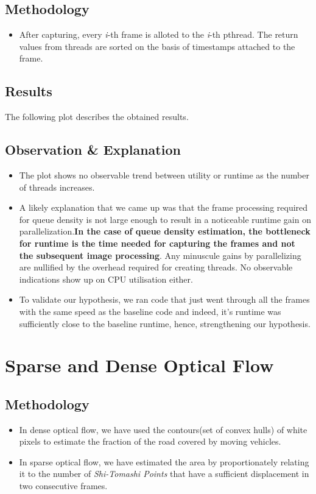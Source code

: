 \documentclass[a4paper]{article}
\begin{document}
\subsection*{Methodology}
\begin{itemize}
    \item After capturing, every \textit{i}-th frame is alloted to the \textit{i}-th pthread.  The return values from threads are sorted on the basis of timestamps attached to the frame.
\end{itemize}
\subsection*{Results}
The following plot describes the obtained results.
\subsection*{Observation \& Explanation}
\begin{itemize}
    \item The plot shows no observable trend between utility or runtime as the number of threads increases. \item A likely explanation that we came up was that the frame processing required for queue density is not large enough to result in a noticeable runtime gain on parallelization.\textbf{In the case of queue density estimation, the bottleneck for runtime is the time needed for capturing the frames and not the subsequent image processing}. Any minuscule gains by parallelizing are nullified by the overhead required for creating threads. No observable indications show up on CPU utilisation either.
    \item To validate our hypothesis, we ran code that just went through all the frames with the same speed as the baseline code and indeed, it's runtime was sufficiently close to the baseline runtime, hence, strengthening our hypothesis.
\end{itemize}
\section*{Sparse and Dense Optical Flow}
\subsection*{Methodology}
\begin{itemize}
    \item In dense optical flow, we have used the contours(set of convex hulls) of white pixels to estimate the fraction of the road covered by moving vehicles.
    \item In sparse optical flow, we have estimated the area by proportionately relating it to the number of \textit{Shi-Tomashi Points} that have a sufficient displacement in two consecutive frames.
\end{itemize}
\end{document}
